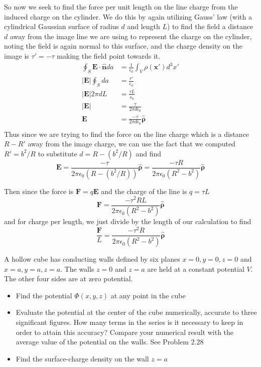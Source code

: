 \documentclass{article}
\begin{document}
So now we seek to find the force per unit length on the line charge from the induced charge on the cylinder. We do this by again utilizing Gauss' law (with a cylindrical Gaussian surface of radius $d$ and length $L$) to find the field a distance $d$ away from the image line we are using to represent the charge on the cylinder, noting the field is again normal to this surface, and the charge density on the image is $\tau'=-\tau$ making the field point towards it.
\begin{align*}
\oint_{S} \mathbf{E}\cdot\mathbf{\hat{n}} da &= \frac{1}{\epsilon_{0}} \int_{V} \rho(\mathbf{x'}) d^{3}x'\\
\left| \mathbf{E} \right|\oint_{S} da &= \frac{\tau'}{\epsilon_{0}}\\
\left| \mathbf{E} \right| 2\pi dL&= \frac{\tau L}{\epsilon_{0}}\\
\left| \mathbf{E} \right| &= \frac{\tau}{2\pi d\epsilon_{0}}\\
\mathbf{E} &= \frac{-\tau}{2\pi d\epsilon_{0}}\mathbf{\hat{\rho}}\\
\end{align*}
Thus since we are trying to find the force on the line charge which is a distance $R-R'$ away from the image charge, we can use the fact that we computed $R'=b^{2}/R$ to substitute $d=R-(b^{2}/R)$ and find
\[ \mathbf{E} = \frac{-\tau}{2\pi\epsilon_{0}(R-(b^{2}/R))} \mathbf{\hat{\rho}} = \frac{-\tau R}{2\pi\epsilon_{0}(R^{2}-b^{2})} \mathbf{\hat{\rho}} \]

Then since the force is $\mathbf{F}=q\mathbf{E}$ and the charge of the line is $q=\tau L$
\[ \mathbf{F} = \frac{-\tau^{2}RL}{2\pi\epsilon_{0}(R^{2}-b^{2})}\mathbf{\hat{\rho}} \]
and for charge per length, we just divide by the length of our calculation to find
\[ \frac{\mathbf{F}}{L} = \boxed{\frac{-\tau^{2}R}{2\pi\epsilon_{0}(R^{2}-b^{2})} \mathbf{\hat{\rho}}} \]

\setcounter{problem}{22}
\begin{problem}
A hollow cube has conducting walls defined by six planes $x=0,y=0,z=0$ and $x=a,y=a,z=a$. The walls $z=0$ and $z=a$ are held at a constant potential $V$. The other four sides are at zero potential.
\begin{itemize}
\item Find the potential $\Phi(x,y,z)$ at any point in the cube
\item Evaluate the potential at the center of the cube numerically, accurate to three significant figures. How many terms in the series is it necessary to keep in order to attain this accuracy? Compare your numerical result with the average value of the potential on the walls. See Problem 2.28
\item Find the surface-charge density on the wall $z=a$
\end{itemize}
\end{problem}
\end{document}

